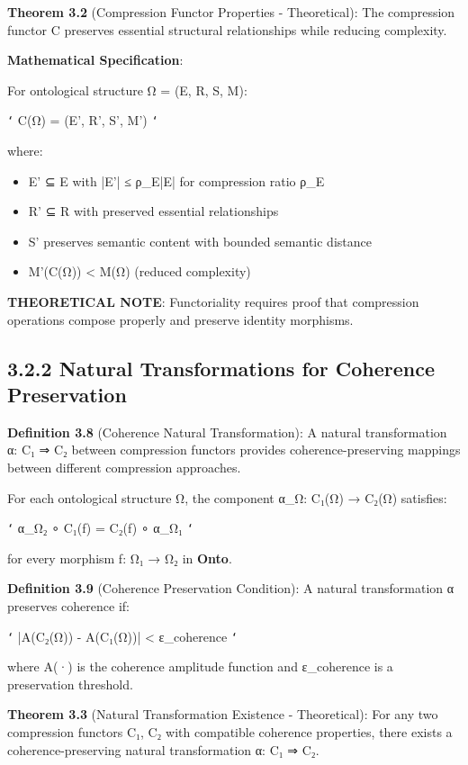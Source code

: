\textbf{Theorem 3.2} (Compression Functor Properties - Theoretical): The compression functor C preserves essential structural relationships while reducing complexity.

\textbf{Mathematical Specification}:

For ontological structure Ω = (E, R, S, M):

\texttt{`}
C(Ω) = (E', R', S', M')
\texttt{`}

where:
\begin{itemize}
\item E' ⊆ E with |E'| ≤ ρ_E|E| for compression ratio ρ_E
\item R' ⊆ R with preserved essential relationships
\item S' preserves semantic content with bounded semantic distance
\item M'(C(Ω)) < M(Ω) (reduced complexity)
\end{itemize}

\textbf{THEORETICAL NOTE}: Functoriality requires proof that compression operations compose properly and preserve identity morphisms.

\subsection{3.2.2 Natural Transformations for Coherence Preservation}

\textbf{Definition 3.8} (Coherence Natural Transformation): A natural transformation α: C₁ ⇒ C₂ between compression functors provides coherence-preserving mappings between different compression approaches.

For each ontological structure Ω, the component α_Ω: C₁(Ω) → C₂(Ω) satisfies:

\texttt{`}
α_{Ω₂} ∘ C₁(f) = C₂(f) ∘ α_{Ω₁}
\texttt{`}

for every morphism f: Ω₁ → Ω₂ in \textbf{Onto}.

\textbf{Definition 3.9} (Coherence Preservation Condition): A natural transformation α preserves coherence if:

\texttt{`}
|A(C₂(Ω)) - A(C₁(Ω))| < ε_coherence
\texttt{`}

where A(·) is the coherence amplitude function and ε_coherence is a preservation threshold.

\textbf{Theorem 3.3} (Natural Transformation Existence - Theoretical): For any two compression functors C₁, C₂ with compatible coherence properties, there exists a coherence-preserving natural transformation α: C₁ ⇒ C₂.

